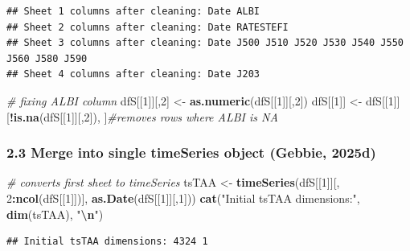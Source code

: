 \documentclass[
  12pt,
]{article}
\newenvironment{Shaded}{\begin{snugshade}}{\end{snugshade}}
\newcommand{\CommentTok}[1]{\textcolor[rgb]{0.56,0.35,0.01}{\textit{#1}}}
\newcommand{\DecValTok}[1]{\textcolor[rgb]{0.00,0.00,0.81}{#1}}
\newcommand{\FunctionTok}[1]{\textcolor[rgb]{0.13,0.29,0.53}{\textbf{#1}}}
\newcommand{\NormalTok}[1]{#1}
\newcommand{\OtherTok}[1]{\textcolor[rgb]{0.56,0.35,0.01}{#1}}
\newcommand{\SpecialCharTok}[1]{\textcolor[rgb]{0.81,0.36,0.00}{\textbf{#1}}}
\newcommand{\StringTok}[1]{\textcolor[rgb]{0.31,0.60,0.02}{#1}}
\begin{document}
\begin{verbatim}
## Sheet 1 columns after cleaning: Date ALBI 
## Sheet 2 columns after cleaning: Date RATESTEFI 
## Sheet 3 columns after cleaning: Date J500 J510 J520 J530 J540 J550 J560 J580 J590 
## Sheet 4 columns after cleaning: Date J203
\end{verbatim}

\begin{Shaded}
\begin{Highlighting}[]
\CommentTok{\# fixing ALBI column}
\NormalTok{dfS[[}\DecValTok{1}\NormalTok{]][,}\DecValTok{2}\NormalTok{] }\OtherTok{\textless{}{-}} \FunctionTok{as.numeric}\NormalTok{(dfS[[}\DecValTok{1}\NormalTok{]][,}\DecValTok{2}\NormalTok{])  }
\NormalTok{dfS[[}\DecValTok{1}\NormalTok{]] }\OtherTok{\textless{}{-}}\NormalTok{ dfS[[}\DecValTok{1}\NormalTok{]][}\SpecialCharTok{!}\FunctionTok{is.na}\NormalTok{(dfS[[}\DecValTok{1}\NormalTok{]][,}\DecValTok{2}\NormalTok{]), ]}\CommentTok{\#removes rows where ALBI is NA}
\end{Highlighting}
\end{Shaded}

\subsubsection{2.3 Merge into single timeSeries object (Gebbie,
2025d)}\label{merge-into-single-timeseries-object-tim_prep-1}

\begin{Shaded}
\begin{Highlighting}[]
\CommentTok{\# converts first sheet to timeSeries}
\NormalTok{tsTAA }\OtherTok{\textless{}{-}} \FunctionTok{timeSeries}\NormalTok{(dfS[[}\DecValTok{1}\NormalTok{]][, }\DecValTok{2}\SpecialCharTok{:}\FunctionTok{ncol}\NormalTok{(dfS[[}\DecValTok{1}\NormalTok{]])], }\FunctionTok{as.Date}\NormalTok{(dfS[[}\DecValTok{1}\NormalTok{]][,}\DecValTok{1}\NormalTok{]))}
\FunctionTok{cat}\NormalTok{(}\StringTok{"Initial tsTAA dimensions:"}\NormalTok{, }\FunctionTok{dim}\NormalTok{(tsTAA), }\StringTok{"}\SpecialCharTok{\textbackslash{}n}\StringTok{"}\NormalTok{)}
\end{Highlighting}
\end{Shaded}

\begin{verbatim}
## Initial tsTAA dimensions: 4324 1
\end{verbatim}
\end{document}
